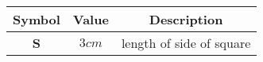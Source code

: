 \begin{tabular}[12pt]{ |c|c|c|}
    \hline
    \textbf{Symbol} & \textbf{Value} & \textbf{Description} \\
    \hline
    \textbf{S} & $3cm$ & length of side of square\\
    \hline
    \end{tabular}
